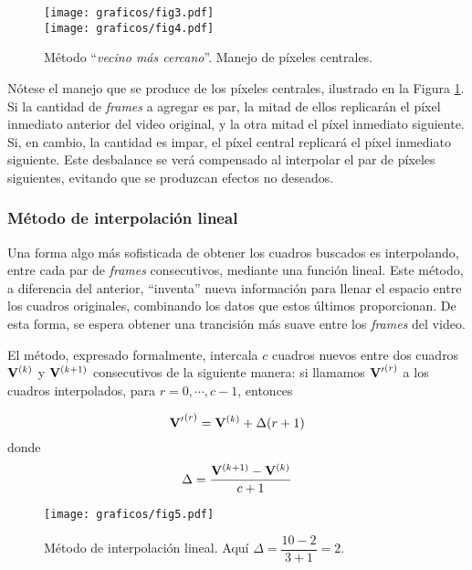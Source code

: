         \begin{figure}[h]
          \centering

          \texttt{[image: graficos/fig3.pdf]} \vspace{2em} \\
          \texttt{[image: graficos/fig4.pdf]} \vspace{1em} \\

          \caption{Método ``\emph{vecino más cercano}''. Manejo de píxeles centrales.}
          \label{fig:vecino}
        \end{figure}

        Nótese el manejo que se produce de los píxeles centrales, ilustrado en la Figura \ref{fig:vecino}. Si la cantidad de \emph{frames} a agregar es par, la mitad de ellos replicarán el píxel inmediato anterior del video original, y la otra mitad el píxel inmediato siguiente. Si, en cambio, la cantidad es impar, el píxel central replicará el píxel inmediato siguiente. Este desbalance se verá compensado al interpolar el par de píxeles siguientes, evitando que se produzcan efectos no deseados.

      \subsubsection{Método de interpolación lineal}
        Una forma algo más sofisticada de obtener los cuadros buscados es interpolando, entre cada par de \emph{frames} consecutivos, mediante una función lineal. Este método, a diferencia del anterior, ``inventa'' nueva información para llenar el espacio entre los cuadros originales, combinando los datos que estos últimos proporcionan. De esta forma, se espera obtener una trancisión más suave entre los \emph{frames} del video.

        El método, expresado formalmente, intercala $c$ cuadros nuevos entre dos cuadros $\mathbf{V}^{(k)}$ y $\mathbf{V}^{(k+1)}$ consecutivos de la siguiente manera: si llamamos $\mathbf{V'}^{(r)}$ a los cuadros interpolados, para $r = 0, \cdots, c - 1$, entonces

        \[ \mathbf{V'}^{(r)} = \mathbf{V}^{(k)} + \Delta (r + 1) \]
        donde
        \[ \Delta = \frac{\mathbf{V}^{(k+1)} - \mathbf{V}^{(k)}}{c + 1} \]

        \begin{figure}[h]
          \centering

          \texttt{[image: graficos/fig5.pdf]} \vspace{1em} \\

          \caption{Método de interpolación lineal. Aquí $\Delta = \dfrac{10 - 2}{3 + 1} = 2$.}
          \label{fig:lineal}
        \end{figure}

